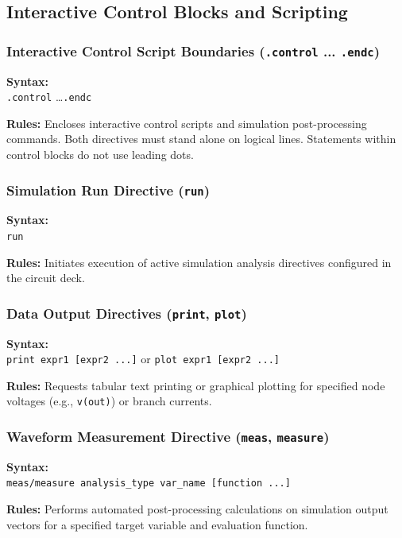 \subsection{Interactive Control Blocks and Scripting}

\subsubsection{Interactive Control Script Boundaries (\texttt{.control} ... \texttt{.endc})}
\begin{compactitem}
    \item \textbf{Syntax:} \\
    \texttt{.control} \dots \texttt{.endc}
    \item \textbf{Rules:} Encloses interactive control scripts and simulation post-processing commands. Both directives must stand alone on logical lines. Statements within control blocks do not use leading dots.
\end{compactitem}

\subsubsection{Simulation Run Directive (\texttt{run})}
\begin{compactitem}
    \item \textbf{Syntax:} \\
    \texttt{run}
    \item \textbf{Rules:} Initiates execution of active simulation analysis directives configured in the circuit deck.
\end{compactitem}

\subsubsection{Data Output Directives (\texttt{print}, \texttt{plot})}
\begin{compactitem}
    \item \textbf{Syntax:} \\
    \texttt{print expr1 [expr2 ...]} or \texttt{plot expr1 [expr2 ...]}
    \item \textbf{Rules:} Requests tabular text printing or graphical plotting for specified node voltages (e.g., \texttt{v(out)}) or branch currents.
\end{compactitem}

\subsubsection{Waveform Measurement Directive (\texttt{meas}, \texttt{measure})}
\begin{compactitem}
    \item \textbf{Syntax:} \\
    \texttt{meas/measure analysis\_type var\_name [function ...]}
    \item \textbf{Rules:} Performs automated post-processing calculations on simulation output vectors for a specified target variable and evaluation function.
\end{compactitem}

